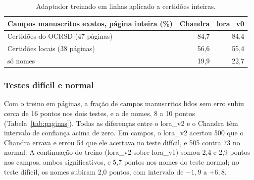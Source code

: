 \documentclass[12pt,a4paper]{article}
\begin{document}
\begin{table}[H]
\centering
\small
\begin{tabular}{@{}lrr@{}}
\toprule
Campos manuscritos exatos, página inteira (\%) & Chandra & lora\_v0 \\
\midrule
Certidões do OCRSD (47 páginas) & 84,7 & 84,4 \\
Certidões locais (38 páginas) & 56,6 & 55,4 \\
\quad só nomes & 19,9 & 22,7 \\
\bottomrule
\end{tabular}
\caption{Adaptador treinado em linhas aplicado a certidões inteiras.}
\label{tab:linhas-paginas}
\end{table}

\subsubsection{Testes difícil e normal}
Com o treino em páginas, a fração de campos manuscritos lidos sem erro subiu cerca de 16 pontos nos dois testes, e a de nomes, 8 a 10 pontos (Tabela~\ref{tab:paginas}). Todas as diferenças entre o lora\_v2 e o Chandra têm intervalo de confiança acima de zero. Em campos, o lora\_v2 acertou 500 que o Chandra errava e errou 54 que ele acertava no teste difícil, e 505 contra 73 no normal. A continuação do treino (lora\_v2 sobre lora\_v1) somou 2,4 e 2,9 pontos nos campos, ambos significativos, e 5,7 pontos nos nomes do teste normal; no teste difícil, os nomes subiram 2,0 pontos, com intervalo de $-1{,}9$ a $+6{,}8$.
\end{document}
